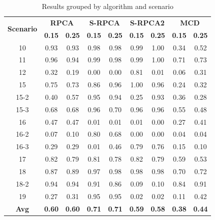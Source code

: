 \documentclass[review]{elsarticle}
\begin{document}
\begin{table}[h!]
  \centering
  \scriptsize
  \caption{Results grouped by algorithm and scenario}
  \label{tab:tab03}
  \begin{tabular}{ c|c c|c c|c c|c c }
	\toprule
	\multirow{2}{*}{\textbf{Scenario}}   &\multicolumn{2}{c}{\textbf{RPCA}} &\multicolumn{2}{c}{\textbf{S-RPCA}} &\multicolumn{2}{c}{\textbf{S-RPCA2}} &\multicolumn{2}{c}{\textbf{MCD}}\\ 
			\hhline{~--------}
			&\textbf{0.15} &\textbf{0.25} &\textbf{0.15} &\textbf{0.25} &\textbf{0.15} &\textbf{0.25} &\textbf{0.15} &\textbf{0.25}\\
	\midrule
		10 & 0.93 & 0.93 &\color{red} 0.98 &\color{red} 0.98 &\color{red} 0.99 &\color{red} 1.00 & 0.34 & 0.52 \\ \hline
		11 & 0.96 & 0.94 &\color{red} 0.99 &\color{red} 0.98 &\color{red} 0.99 &\color{red} 1.00 & 0.71 & 0.73 \\ \hline
		12 & 0.32 & 0.19 & 0.00 & 0.00 &\color{red} 0.81 & 0.01 & 0.06 & 0.31 \\ \hline
		15 & 0.75 & 0.73 & 0.86 &\color{red} 0.96 &\color{red} 1.00 &\color{red} 0.96 & 0.24 & 0.32 \\ \hline
		15-2 & 0.40 & 0.57 &\color{red} 0.95 &\color{red} 0.94 & 0.25 & 0.93 & 0.36 & 0.28 \\ \hline
		15-3 & 0.68 & 0.68 &\color{red} 0.96 & 0.70 &\color{red} 0.96 &\color{red} 0.96 & 0.55 & 0.48 \\ \hline
		16 &\color{red} 0.47 &\color{red} 0.47 & 0.01 & 0.01 & 0.01 & 0.00 & 0.27 & 0.41 \\ \hline
		16-2 & 0.07 & 0.10 &\color{red} 0.80 & 0.68 & 0.00 & 0.00 & 0.04 & 0.04 \\ \hline
		16-3 & 0.29 & 0.29 & 0.01 & 0.46 &\color{red} 0.79 & 0.76 & 0.15 & 0.10 \\ \hline
		17 &\color{red} 0.82 & 0.79 &\color{red} 0.81 & 0.78 &\color{red} 0.82 & 0.79 & 0.59 & 0.53 \\ \hline
		18 & 0.87 & 0.89 & 0.97 &\color{red} 0.98 &\color{red} 0.98 &\color{red} 0.98 & 0.70 & 0.72 \\ \hline
		18-2 &\color{red} 0.94 &\color{red} 0.94 &\color{red} 0.91 & 0.86 & 0.09 & 0.10 & 0.84 & 0.91 \\ \hline
		19 & 0.27 & 0.31 &\color{red} 0.95 &\color{red} 0.95 & 0.02 & 0.02 & 0.11 & 0.42 \\ \hline
		\rowcolor{Gray} \textbf{Avg} & \textbf{0.60} & \textbf{0.60} &\color{red} \textbf{0.71} &\color{red} \textbf{0.71} & \textbf{0.59} & \textbf{0.58} & \textbf{0.38} & \textbf{0.44} \\
    \bottomrule
  \end{tabular}
\end{table}
\end{document}
